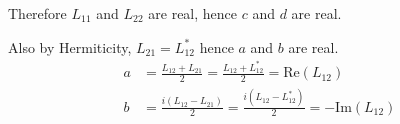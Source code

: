 \documentclass[12pt]{article}
\begin{document}
Therefore $L_{11}$ and $L_{22}$ are real, hence $c$ and $d$ are real.

\bigskip
Also by Hermiticity, $L_{21}=L_{12}^*$ hence $a$ and $b$ are real.
\begin{align*}
a&=\frac{L_{12}+L_{21}}{2}=\frac{L_{12}+L_{12}^*}{2}=\text{Re}(L_{12})
\\
b&=\frac{i(L_{12}-L_{21})}{2}=\frac{i(L_{12}-L_{12}^*)}{2}=-\text{Im}(L_{12})
\end{align*}
\end{document}
